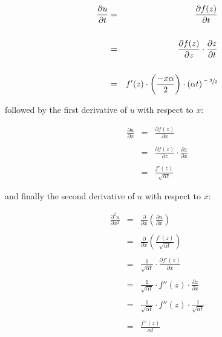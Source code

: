 \documentclass{report}
\begin{document}
\begin{eqnarray*} 
    \frac{\partial u}{\partial t} & = & \frac{\partial f(z)}{\partial t} \\\\
                                  & = & \frac{\partial f(z)}{\partial z} \cdot \frac{\partial z}{\partial t} \\\\
                                  & = & f'(z) \cdot \left( \frac{-x \alpha}{2} \right) \cdot (\alpha t)^{\sfrac{-3}{2}} 
\end{eqnarray*}\medskip

followed by the first derivative of $u$ with respect to $x$:\bigskip

\begin{eqnarray*} 
    \frac{\partial u}{\partial x} & = & \frac{\partial f(z)}{\partial x} \\\\
                                  & = & \frac{\partial f(z)}{\partial z} \cdot \frac{\partial z}{\partial x} \\\\
                                  & = & \frac{f'(z)}{\sqrt{\alpha t}}
\end{eqnarray*}\medskip

and finally the second derivative of $u$ with respect to $x$:\bigskip

\begin{eqnarray*} 
\frac{\partial^2 u}{\partial x^2} & = & \frac{\partial}{\partial x} \left( \frac{\partial u}{\partial x} \right) \\\\
                                  & = & \frac{\partial}{\partial x} \left( \frac{f'(z)}{\sqrt{\alpha t}} \right) \\\\
                                  & = & \frac{1}{\sqrt{\alpha t}} \cdot \frac{\partial f'(z)}{\partial x} \\\\
                                  & = & \frac{1}{\sqrt{\alpha t}} \cdot f''(z) \cdot \frac{\partial z}{\partial x} \\\\
                                  & = & \frac{1}{\sqrt{\alpha t}} \cdot f''(z) \cdot \frac{1}{\sqrt{\alpha t}} \\\\
                                  & = & \frac{f''(z)}{\alpha t} 
\end{eqnarray*}\medskip
\end{document}
